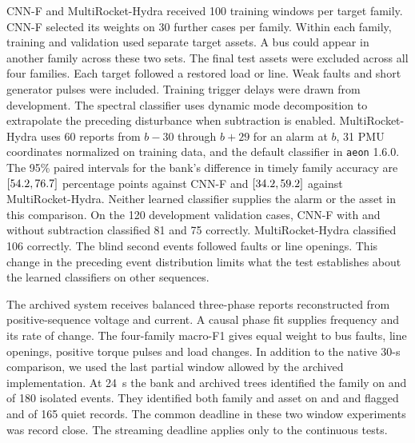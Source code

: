 CNN-F and MultiRocket-Hydra received 100 training windows per target
family. CNN-F selected its weights on 30 further cases per family.
Within each family, training and validation used separate target
assets. A bus could appear in another family across these two sets.
The final test assets were excluded across all four families. Each
target followed a restored load or line. Weak faults and short generator pulses were
included. Training trigger delays were drawn from development. The
spectral classifier uses dynamic mode decomposition to extrapolate the
preceding disturbance when subtraction is enabled. MultiRocket-Hydra
uses 60 reports from $b-30$ through $b+29$ for an alarm at $b$,
31 PMU coordinates normalized on training data, and the default
classifier in \texttt{aeon} 1.6.0. The 95\% paired intervals for the
bank's difference in timely family accuracy are $[54.2, 76.7]$
percentage points against CNN-F and $[34.2, 59.2]$ against
MultiRocket-Hydra. Neither learned classifier supplies the alarm
or the asset in this comparison. On the 120 development validation
cases, CNN-F with and without subtraction classified 81 and 75
correctly. MultiRocket-Hydra classified 106 correctly. The blind
second events followed faults or line openings. This change in the
preceding event distribution limits what the test establishes about
the learned classifiers on other sequences.

The archived system receives balanced three-phase reports reconstructed
from positive-sequence voltage and current. A causal phase fit supplies
frequency and its rate of change. The four-family macro-F1 gives equal
weight to bus faults, line openings, positive torque pulses and load
changes. In addition to the native 30-s comparison, we used the last
partial window allowed by the archived implementation. At 24~s the bank
and archived trees identified the family on \RepBankPartialFamily{}
and \RepArchPartialFamily{} of 180 isolated events. They identified
both family and asset on \RepBankPartialJoint{} and
\RepArchPartialJoint{} and flagged \RepBankPartialQuiet{} and
\RepArchPartialQuiet{} of 165 quiet records. The common deadline in
these two window experiments was record close. The streaming
deadline applies only to the continuous tests.


